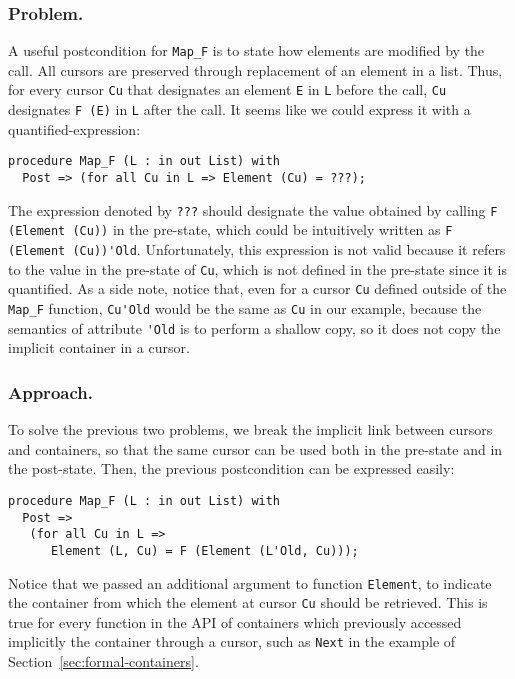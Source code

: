 \documentclass[runningheads,a4paper]{llncs}
\begin{document}
\subsubsection{Problem.}

A useful postcondition for \verb|Map_F| is to state how elements are
modified by the call. All cursors are preserved through replacement of an
element in a list. Thus, for every cursor \verb|Cu| that designates an element
\verb|E| in \verb|L| before the call, \verb|Cu| designates \verb|F (E)| in
\verb|L| after the call. It seems like we could express it with a
quantified-expression:
\begin{lstlisting}
procedure Map_F (L : in out List) with 
  Post => (for all Cu in L => Element (Cu) = ???);
\end{lstlisting}

The expression denoted by \verb|???| should designate the value obtained by calling
\verb|F (Element (Cu))| in the pre-state, which could be intuitively written as
\verb|F (Element (Cu))'Old|. Unfortunately, this expression is not valid
because it refers to the value in the pre-state of \verb|Cu|, which is not
defined in the pre-state
since it is quantified.
%
As a side note, notice that, even for a cursor
\verb|Cu| defined outside of the \verb|Map_F| function, \verb|Cu'Old| would be the same as
\verb|Cu| in our example, because the semantics of attribute \verb|'Old| is to
perform a shallow copy, so it does not copy the implicit container in a cursor.


\subsubsection{Approach.}
To solve the previous two problems,
we break the implicit link between cursors and containers, so that the same cursor can be used both in
the pre-state and in the post-state. Then, the previous postcondition can be
expressed easily:
\begin{lstlisting}
procedure Map_F (L : in out List) with 
  Post => 
   (for all Cu in L =>
      Element (L, Cu) = F (Element (L'Old, Cu)));
\end{lstlisting}

Notice that we passed an additional argument to function \verb|Element|, to
indicate the container from which the element at cursor \verb|Cu| should be
retrieved. This is true for every function in the API of containers which
previously accessed implicitly the container through a cursor, such as 
\verb|Next| in the example of Section~\ref{sec:formal-containers}.
\end{document}
